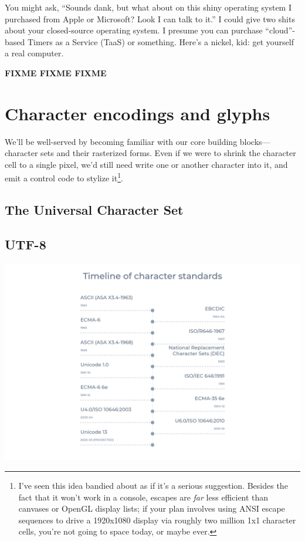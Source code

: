 \documentclass[letterpaper,10pt]{article}
\begin{document}
You might ask, ``Sounds dank, but what about on this shiny operating system I
purchased from Apple or Microsoft? Look I can talk to it.'' I could give two
shits about your closed-source operating system. I presume you can purchase
``cloud''-based Timers as a Service (TaaS) or something. Here's a nickel, kid:
get yourself a real computer.

\textbf{FIXME FIXME FIXME}


\newpage


\section{Character encodings and glyphs}
\label{section:unicode}
We'll be well-served by becoming familiar with our core building
blocks---character sets and their rasterized forms. Even if we were to shrink
the character cell to a single pixel, we'd still need write one or another
character into it, and emit a control code to stylize it\footnote{I've seen
this idea bandied about as if it's a serious suggestion. Besides the fact
that it won't work in a console, escapes are \textit{far} less efficient than
canvases or OpenGL display lists; if your plan involves using ANSI escape
sequences to drive a 1920x1080 display via roughly two million 1x1 character
cells, you're not going to space today, or maybe ever\cite{upgoerfive}.}.
\subsection{The Universal Character Set}
\subsection{UTF-8}

\begin{center}
\includegraphics[width=.9\linewidth]{media/charset-timeline.png}
\end{center}
\end{document}
